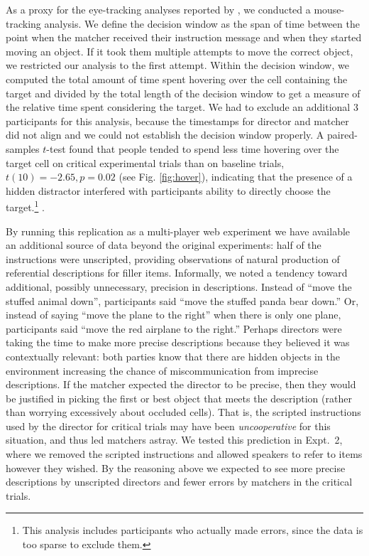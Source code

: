 \documentclass[manuscript]{stjour}
\begin{document}
As a proxy for the eye-tracking analyses reported by \cite{KeysarLinBarr03_LimitsOnTheoryOfMindUse}, we conducted a mouse-tracking analysis. We define the decision window as the span of time between the point when the matcher received their instruction message and when they started moving an object. If it took them multiple attempts to move the correct object, we restricted our analysis to the first attempt. Within the decision window, we computed the total amount of time spent hovering over the cell containing the target and divided by the total length of the decision window to get a measure of the relative time spent considering the target. We had to exclude an additional 3 participants for this analysis, because the timestamps for director and matcher did not align and we could not establish the decision window properly. A paired-samples $t$-test found that people tended to spend less time hovering over the target cell on critical experimental trials than on baseline trials, $t(10) = -2.65, p = 0.02$ (see Fig. \ref{fig:hover}), indicating that the presence of a hidden distractor interfered with participants ability to directly choose the target.\footnote{This analysis includes participants who actually made errors, since the data is too sparse to exclude them.} . %

By running this replication as a multi-player web experiment we have available an additional source of data beyond the original experiments: half of the instructions were unscripted, providing observations of natural production of referential descriptions for filler items. 
Informally, we noted a tendency toward additional, possibly unnecessary, precision in descriptions. Instead of ``move the stuffed animal down'', participants said ``move the stuffed panda bear down.'' Or, instead of saying ``move the plane to the right'' when there is only one plane, participants said ``move the red airplane to the right.'' 
Perhaps directors were taking the time to make more precise descriptions because they believed it was contextually relevant: both parties know that there are hidden objects in the environment increasing the chance of miscommunication from imprecise descriptions. 
If the matcher expected the director to be precise, then they would be justified in picking the first or best object that meets the description (rather than worrying excessively about occluded cells). 
That is, the scripted instructions used by the director for critical trials may have been \emph{uncooperative} for this situation, and thus led matchers astray. 
We tested this prediction in Expt.~2, where we removed the scripted instructions and allowed speakers to refer to items however they wished.
By the reasoning above we expected to see more precise descriptions by unscripted directors and fewer errors by matchers in the critical trials.
\end{document}
